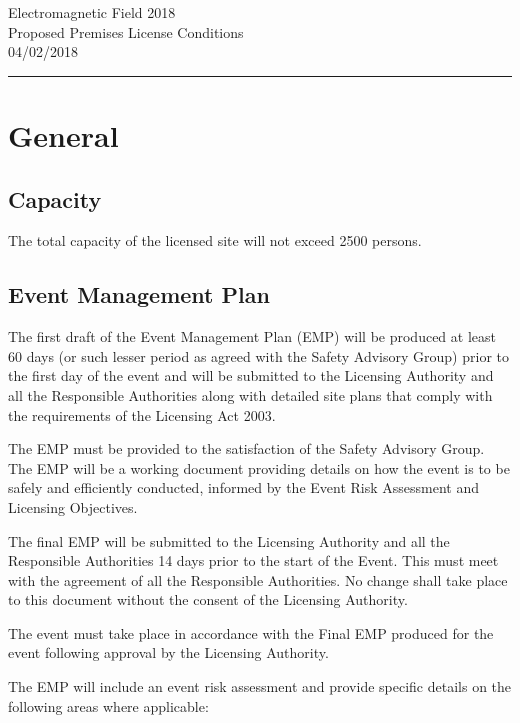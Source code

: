 

\begin{center}
{\Large Electromagnetic Field 2018} \\
{\large Proposed Premises License Conditions} \\
04/02/2018
\end{center}
\hrule
\section{General}\label{general}

\subsection{Capacity}\label{capacity}

The total capacity of the licensed site will not exceed 2500 persons.

\subsection{Event Management Plan}\label{event-management-plan}

The first draft of the Event Management Plan (EMP) will be produced at
least 60 days (or such lesser period as agreed with the Safety Advisory
Group) prior to the first day of the event and will be submitted to the
Licensing Authority and all the Responsible Authorities along with
detailed site plans that comply with the requirements of the Licensing
Act 2003.

The EMP must be provided to the satisfaction of the Safety Advisory
Group. The EMP will be a working document providing details on how the
event is to be safely and efficiently conducted, informed by the Event
Risk Assessment and Licensing Objectives.

The final EMP will be submitted to the Licensing Authority and all the
Responsible Authorities 14 days prior to the start of the Event. This
must meet with the agreement of all the Responsible Authorities. No
change shall take place to this document without the consent of the
Licensing Authority.

The event must take place in accordance with the Final EMP produced for
the event following approval by the Licensing Authority.

The EMP will include an event risk assessment and provide specific
details on the following areas where applicable:

